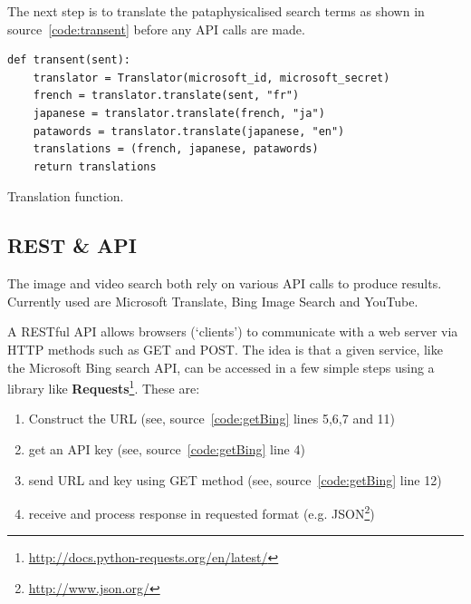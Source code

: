 The next step is to translate the pataphysicalised search terms as shown in source~\ref{code:transent} before any \ac{API} calls are made.

\begin{listing}
  \begin{verbatim}
def transent(sent):
    translator = Translator(microsoft_id, microsoft_secret)
    french = translator.translate(sent, "fr")
    japanese = translator.translate(french, "ja")
    patawords = translator.translate(japanese, "en")
    translations = (french, japanese, patawords)
    return translations
  \end{verbatim}
\caption{Translation function.}
\label{code:transent}
\end{listing}



\subsection{REST \& API}

The image and video search both rely on various \ac{API} calls to produce results. Currently used are Microsoft Translate, Bing Image Search and YouTube.

A \acs{REST}ful \ac{API} allows browsers (`clients') to communicate with a web server via \acs{HTTP} methods such as GET and POST. The idea is that a given service, like the Microsoft Bing search \ac{API}, can be accessed in a few simple steps using a library like \textbf{Requests}\footnote{\url{http://docs.python-requests.org/en/latest/}}. These are:

\begin{enumerate}
  \item Construct the \ac{URL} (see, source~\ref{code:getBing} lines 5,6,7 and 11)
  \item get an \ac{API} key (see, source~\ref{code:getBing} line 4)
  \item send \ac{URL} and key using GET method (see, source~\ref{code:getBing} line 12)
  \item receive and process response in requested format (e.g. \ac{JSON}\footnote{\url{http://www.json.org/}})
\end{enumerate}

